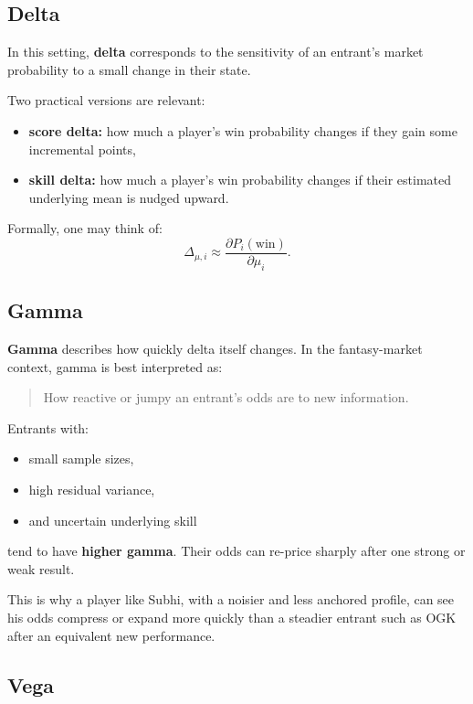 \documentclass[11pt]{article}
\begin{document}
\subsection{Delta}

In this setting, \textbf{delta} corresponds to the sensitivity of an entrant's market probability to a small change in their state.

Two practical versions are relevant:
\begin{itemize}[itemsep=2pt]
    \item \textbf{score delta:} how much a player's win probability changes if they gain some incremental points,
    \item \textbf{skill delta:} how much a player's win probability changes if their estimated underlying mean is nudged upward.
\end{itemize}

Formally, one may think of:
$$
\Delta_{\mu,i} \approx \frac{\partial P_i(\text{win})}{\partial \mu_i}.
$$

\subsection{Gamma}

\textbf{Gamma} describes how quickly delta itself changes. In the fantasy-market context, gamma is best interpreted as:

\begin{quote}
How reactive or jumpy an entrant's odds are to new information.
\end{quote}

Entrants with:
\begin{itemize}[itemsep=2pt]
    \item small sample sizes,
    \item high residual variance,
    \item and uncertain underlying skill
\end{itemize}
tend to have \textbf{higher gamma}. Their odds can re-price sharply after one strong or weak result.

This is why a player like Subhi, with a noisier and less anchored profile, can see his odds compress or expand more quickly than a steadier entrant such as OGK after an equivalent new performance.

\subsection{Vega}
\end{document}
